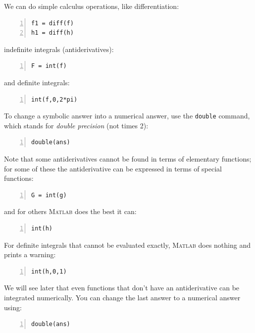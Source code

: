 We can do simple calculus operations, like differentiation:
\begin{lstlisting}[frame=none,numbers=left]
f1 = diff(f)
h1 = diff(h)
\end{lstlisting}
indefinite integrals (antiderivatives):
\begin{lstlisting}[frame=none,numbers=left]
F = int(f)
\end{lstlisting}
and definite integrals:
\begin{lstlisting}[frame=none,numbers=left]
int(f,0,2*pi)
\end{lstlisting}
To change a symbolic answer into a numerical answer, use the
\verb&double& command, which stands for {\em double precision}
(not times 2):
\begin{lstlisting}[frame=none,numbers=left]
double(ans)
\end{lstlisting}
Note that some antiderivatives cannot be found in
terms of elementary functions; for some of these the antiderivative
can be expressed in terms of special functions:
\begin{lstlisting}[frame=none,numbers=left]
G = int(g)
\end{lstlisting}
and for others \textsc{Matlab} does the best it can:
\begin{lstlisting}[frame=none,numbers=left]
int(h)
\end{lstlisting}

For definite integrals that cannot be evaluated exactly,
\textsc{Matlab} does nothing and prints a warning:
\begin{lstlisting}[frame=none,numbers=left]
int(h,0,1)
\end{lstlisting}
We will see later that even functions that don't have an
antiderivative can be integrated numerically. You can change
the last answer to a numerical answer using:
\begin{lstlisting}[frame=none,numbers=left]
double(ans)
\end{lstlisting}

